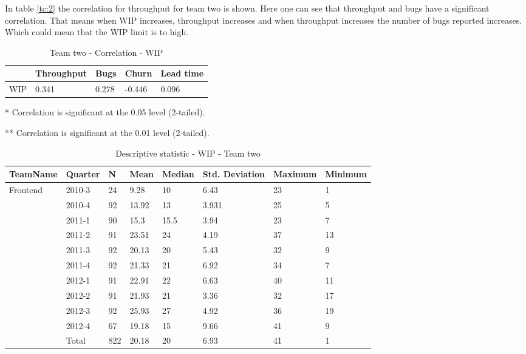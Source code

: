 \documentclass[UKenglish]{ifimaster}  %
\begin{document}
In table \ref{tc:2} the correlation for throughput for team two is shown.  Here one can see that throughput and bugs have a significant correlation. That means when WIP increases, throughput increases and when throughput increases the number of bugs reported increases. Which could mean that the WIP limit is to high.


\begin{table}[!htbp] 
 \centering 
\begin{tabular}{|l|l|l|l|l|} \hline
&Throughput & Bugs & Churn  & Lead time  \\ 
\hline
	WIP &    0.341 & 0.278  & -0.446 & 0.096 \\ \hline
 \end{tabular}
  \caption{Team two - Correlation - WIP} 
  \label{wc:2}
  \centerline {* Correlation is significant at the 0.05 level (2-tailed).}
      \centerline{  ** Correlation is significant at the 0.01 level (2-tailed).}
 \end{table} 
 
 
  \begin{table}[!htbp]
  \begin{tabular}{ | l | l | l | l | l | l | l | l | }
\hline
TeamName & Quarter & N & Mean & Median & Std. Deviation & Maximum & Minimum \\ \hline
Frontend & 2010-3 & 24 & 9.28 & 10 & 6.43 & 23 & 1 \\ \hline
	 & 2010-4 & 92 & 13.92 & 13 & 3.931 & 25 & 5 \\ \hline
	 & 2011-1 & 90 & 15.3 & 15.5 & 3.94 & 23 & 7 \\ \hline
	 & 2011-2 & 91 & 23.51 & 24 & 4.19 & 37 & 13 \\ \hline
	 & 2011-3 & 92 & 20.13 & 20 & 5.43 & 32 & 9 \\ \hline
	 & 2011-4 & 92 & 21.33 & 21 & 6.92 & 34 & 7 \\ \hline
	 & 2012-1 & 91 & 22.91 & 22 & 6.63 & 40 & 11 \\ \hline
	 & 2012-2 & 91 & 21.93 & 21 & 3.36 & 32 & 17 \\ \hline
	 & 2012-3 & 92 & 25.93 & 27 & 4.92 & 36 & 19 \\ \hline
	 & 2012-4 & 67 & 19.18 & 15 & 9.66 & 41 & 9 \\ \hline
	 & Total & 822 & 20.18 & 20 & 6.93 & 41 & 1 \\ \hline
	 \end{tabular}
  	  \caption{Descriptive statistic - WIP - Team two }%
	  \label{dsw:2}
\end{table}	
\end{document}
